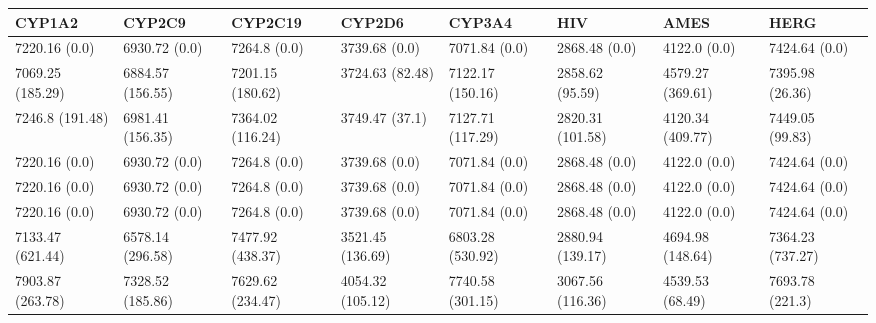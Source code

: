 \begin{tabular}{llllllll}
\toprule
CYP1A2 & CYP2C9 & CYP2C19 & CYP2D6 & CYP3A4 & HIV & AMES & HERG \\
\midrule
7220.16 (0.0) & 6930.72 (0.0) & 7264.8 (0.0) & 3739.68 (0.0) & 7071.84 (0.0) & 2868.48 (0.0) & 4122.0 (0.0) & 7424.64 (0.0) \\
7069.25 (185.29) & 6884.57 (156.55) & 7201.15 (180.62) & 3724.63 (82.48) & 7122.17 (150.16) & 2858.62 (95.59) & 4579.27 (369.61) & 7395.98 (26.36) \\
7246.8 (191.48) & 6981.41 (156.35) & 7364.02 (116.24) & 3749.47 (37.1) & 7127.71 (117.29) & 2820.31 (101.58) & 4120.34 (409.77) & 7449.05 (99.83) \\
7220.16 (0.0) & 6930.72 (0.0) & 7264.8 (0.0) & 3739.68 (0.0) & 7071.84 (0.0) & 2868.48 (0.0) & 4122.0 (0.0) & 7424.64 (0.0) \\
7220.16 (0.0) & 6930.72 (0.0) & 7264.8 (0.0) & 3739.68 (0.0) & 7071.84 (0.0) & 2868.48 (0.0) & 4122.0 (0.0) & 7424.64 (0.0) \\
7220.16 (0.0) & 6930.72 (0.0) & 7264.8 (0.0) & 3739.68 (0.0) & 7071.84 (0.0) & 2868.48 (0.0) & 4122.0 (0.0) & 7424.64 (0.0) \\
7133.47 (621.44) & 6578.14 (296.58) & 7477.92 (438.37) & 3521.45 (136.69) & 6803.28 (530.92) & 2880.94 (139.17) & 4694.98 (148.64) & 7364.23 (737.27) \\
7903.87 (263.78) & 7328.52 (185.86) & 7629.62 (234.47) & 4054.32 (105.12) & 7740.58 (301.15) & 3067.56 (116.36) & 4539.53 (68.49) & 7693.78 (221.3) \\
\bottomrule
\end{tabular}
